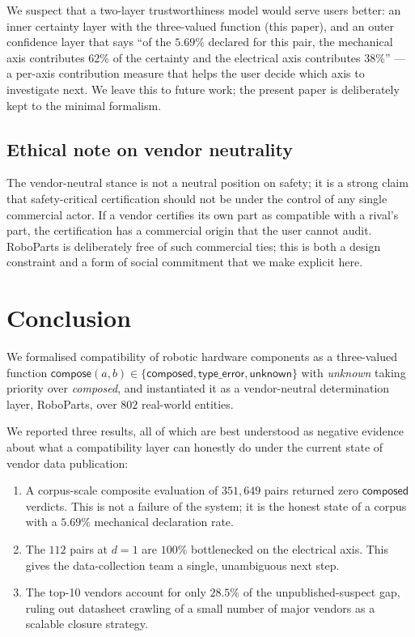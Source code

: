 We suspect that a two-layer trustworthiness model would serve
users better: an inner certainty layer with the three-valued
function (this paper), and an outer confidence layer that says
``of the $5.69\%$ declared for this pair, the mechanical axis
contributes 62\% of the certainty and the electrical axis
contributes 38\%'' — a per-axis contribution measure that helps
the user decide which axis to investigate next. We leave this to
future work; the present paper is deliberately kept to the
minimal formalism.

\subsection{Ethical note on vendor neutrality}

The vendor-neutral stance is not a neutral position on safety;
it is a strong claim that safety-critical certification should
not be under the control of any single commercial actor. If a
vendor certifies its own part as compatible with a rival's part,
the certification has a commercial origin that the user cannot
audit. RoboParts is deliberately free of such commercial ties;
this is both a design constraint and a form of social commitment
that we make explicit here.

\section{Conclusion}

We formalised compatibility of robotic hardware components as a
three-valued function
$\mathsf{compose}(a, b) \in \{\mathsf{composed}, \mathsf{type\_error},
\mathsf{unknown}\}$ with \emph{unknown} taking priority over
\emph{composed}, and instantiated it as a vendor-neutral determination
layer, RoboParts, over $802$ real-world entities.

We reported three results, all of which are best understood as
negative evidence about what a compatibility layer can honestly do
under the current state of vendor data publication:

\begin{enumerate}[nosep]
\item A corpus-scale composite evaluation of $351{,}649$ pairs
returned zero $\mathsf{composed}$ verdicts. This is not a failure of
the system; it is the honest state of a corpus with a $5.69\%$
mechanical declaration rate.

\item The $112$ pairs at $d=1$ are $100\%$ bottlenecked on the
electrical axis. This gives the data-collection team a single,
unambiguous next step.

\item The top-10 vendors account for only $28.5\%$ of the
unpublished-suspect gap, ruling out datasheet crawling of a small
number of major vendors as a scalable closure strategy.
\end{enumerate}

